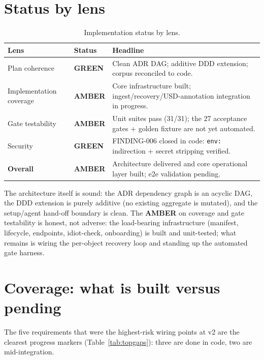 \documentclass[a4paper,11pt]{report}
\newcommand{\code}[1]{\texttt{#1}}
\newcommand{\pass}{\textcolor{SuccessGreen}{\textbf{GREEN}}}
\newcommand{\amber}{\textcolor{WarningAmber}{\textbf{AMBER}}}
\begin{document}
\section{Status by lens}
\begin{table}[h]
\centering\small
\caption{Implementation status by lens.}\label{tab:qe}
\begin{tabularx}{\textwidth}{L{0.27\textwidth} l L{0.43\textwidth}}
\toprule
\textbf{Lens} & \textbf{Status} & \textbf{Headline} \\
\midrule
Plan coherence & \pass{} & Clean ADR DAG; additive DDD extension; corpus reconciled to code. \\
Implementation coverage & \amber{} & Core infrastructure built; ingest/recovery/USD-annotation integration in progress. \\
Gate testability & \amber{} & Unit suites pass (31/31); the 27 acceptance gates + golden fixture are not yet automated. \\
Security & \pass{} & FINDING-006 closed in code: \code{env:} indirection + secret stripping verified. \\
\midrule
\textbf{Overall} & \amber{} & Architecture delivered and core operational layer built; e2e validation pending. \\
\bottomrule
\end{tabularx}
\end{table}

The architecture itself is sound: the ADR dependency graph is an acyclic DAG, the DDD extension is
purely additive (no existing aggregate is mutated), and the setup/agent hand-off boundary is clean. The
\amber{} on coverage and gate testability is honest, not adverse: the load-bearing infrastructure
(manifest, lifecycle, endpoints, idiot-check, onboarding) is built and unit-tested; what remains is
wiring the per-object recovery loop and standing up the automated gate harness.

\section{Coverage: what is built versus pending}
The five requirements that were the highest-risk wiring points at v2 are the clearest progress markers
(Table~\ref{tab:topgaps}): three are done in code, two are mid-integration.
\end{document}
